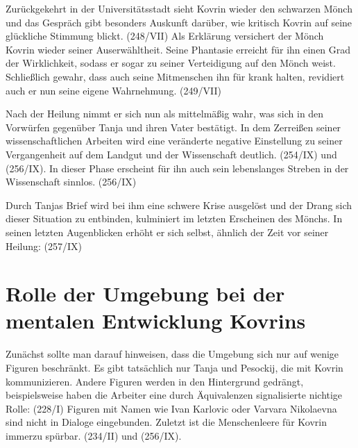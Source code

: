 \documentclass{../../sem_paper}
\begin{document}
Zurückgekehrt in der Universitätsstadt sieht Kovrin wieder den schwarzen Mönch und das
Gespräch gibt besonders Auskunft darüber, wie kritisch Kovrin auf seine glückliche Stimmung
blickt. (248/VII) Als Erklärung versichert der Mönch Kovrin wieder
seiner Auserwähltheit. Seine Phantasie erreicht für ihn einen Grad der Wirklichkeit, sodass er sogar
zu seiner Verteidigung auf den Mönch weist. Schließlich gewahr, dass auch seine Mitmenschen ihn
für krank halten, revidiert auch er nun seine eigene Wahrnehmung. (249/VII)

Nach der Heilung nimmt er sich nun als mittelmäßig wahr, was sich in den Vorwürfen gegenüber
Tanja und ihren Vater bestätigt. In dem Zerreißen seiner wissenschaftlichen Arbeiten wird eine
veränderte negative Einstellung zu seiner Vergangenheit auf dem Landgut und der Wissenschaft
deutlich. (254/IX) und (256/IX). In dieser Phase erscheint für ihn auch sein lebenslanges Streben
in der Wissenschaft sinnlos. (256/IX)

Durch Tanjas Brief wird bei ihm eine schwere Krise ausgelöst und der Drang sich dieser
Situation zu entbinden, kulminiert im letzten Erscheinen des Mönchs. In seinen letzten
Augenblicken erhöht er sich selbst, ähnlich der Zeit vor seiner Heilung: 
(257/IX)

\section{Rolle der Umgebung bei der mentalen Entwicklung Kovrins}
Zunächst sollte man darauf hinweisen, dass die Umgebung sich nur auf wenige Figuren beschränkt.
Es gibt tatsächlich nur Tanja und Pesockij, die mit Kovrin kommunizieren. Andere Figuren werden
in den Hintergrund gedrängt, beispielsweise haben die Arbeiter eine durch Äquivalenzen
signalisierte nichtige Rolle: (228/I) Figuren mit Namen wie Ivan Karlovic oder Varvara Nikolaevna sind nicht in
Dialoge eingebunden. Zuletzt ist die Menschenleere für Kovrin immerzu spürbar. (234/II) und (256/IX).
\end{document}
